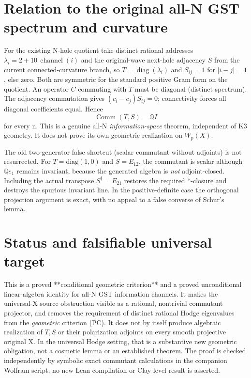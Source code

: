 \documentclass[11pt]{article}
\newcommand{\Q}{\mathbb Q}
\newcommand{\Comm}{\operatorname{Comm}}
\begin{document}
\section{Relation to the original all-N GST spectrum and curvature}
For the existing N-hole quotient take distinct rational addresses $\lambda_i=2+10\,\operatorname{channel}(i)$ and the original-wave next-hole adjacency $S$ from the current connected-curvature branch, so $T=\operatorname{diag}(\lambda_i)$ and $S_{ij}=1$ for $|i-j|=1$, else zero. Both are symmetric for the standard positive Gram form on the quotient. An operator $C$ commuting with $T$ must be diagonal (distinct spectrum). The adjacency commutation gives $(c_i-c_j)S_{ij}=0$; connectivity forces all diagonal coefficients equal. Hence
\[
 \boxed{\Comm(T,S)=\Q I}
\]
for every n. This is a genuine all-N \emph{information-space} theorem, independent of K3 geometry. It does not prove its own geometric realization on $W_p(X)$.

The old two-generator false shortcut (scalar commutant without adjoints) is not resurrected. For
$T=\mathrm{diag}(1,0)$ and $S=E_{12}$, the commutant is scalar although $\Q e_1$ remains invariant, because the generated algebra is \emph{not} adjoint-closed. Including the actual transpose $S^\dagger=E_{21}$ restores the required *-closure and destroys the spurious invariant line. In the positive-definite case the orthogonal projection argument is exact, with no appeal to a false converse of Schur's lemma.

\section{Status and falsifiable universal target}
This is a proved **conditional geometric criterion** and a proved unconditional linear-algebra identity for all-N GST information channels. It makes the universal-X source obstruction visible as a rational, nontrivial commutant projector, and removes the requirement of distinct rational Hodge eigenvalues from the \emph{geometric} criterion (PC). It does not by itself produce algebraic realization of $T,S$ or their polarization adjoints on every smooth projective original X. In the universal Hodge setting, that is a substantive new geometric obligation, not a cosmetic lemma or an established theorem. The proof is checked independently by symbolic exact commutant calculations in the companion Wolfram script; no new Lean compilation or Clay-level result is asserted.
\end{document}

